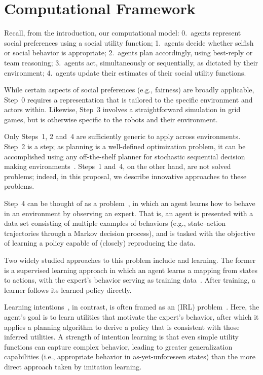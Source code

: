 
\section{Computational Framework}
\label{sec:process}

Recall, from the introduction, our computational model:
0.~agents represent social preferences using a social utility function;
1.~agents decide whether selfish or social behavior is appropriate;
2.~agents plan accordingly, using best-reply or team reasoning;
3.~agents act, simultaneously or sequentially, as dictated by their environment;
4.~agents update their estimates of their social utility functions.

While certain aspects of social preferences (e.g., fairness) are
broadly applicable, Step~0 requires a representation that is tailored
to the specific environment and actors within.  Likewise, Step~3
involves a straightforward simulation in grid games, but is otherwise
specific to the robots and their environment.

Only Steps~1, 2 and~4 are sufficiently generic to apply across
environments.  Step~2 is a  step; as planning is a
well-defined optimization problem, it can be accomplished using any
off-the-shelf planner for stochastic sequential decision making
environments~\cite{Barto95,bellman57,boutilier99,collins95,kearns99b,kocsis06}.
%
Steps~1 and~4, on the other hand, are not solved problems; indeed, in
this proposal, we describe innovative approaches to these problems.

Step~4 can be thought of as a 
problem~\cite{argall09}, in which an agent learns how to behave in an
environment by observing an expert.  That is, an agent is presented
with a data set consisting of multiple examples of behaviors (e.g.,
state--action trajectories through a Markov decision process), and is
tasked with the objective of learning a policy capable of (closely)
reproducing the data.

Two widely studied approaches to this problem include
 and  learning.  The former is a
supervised learning approach in which an agent learns a mapping from
states to actions, with the expert's behavior serving as training
data~\cite{pomerleau93}.  After training, a learner follows its
learned policy directly.

Learning intentions~\cite{macglashan15b}, in contrast, is often framed
as an  (IRL)
problem~\cite{babes11,ng00}.  Here, the agent's goal is to learn
utilities that motivate the expert's behavior, after which it applies a
planning algorithm to derive a policy that is consistent with those
inferred utilities.  A strength of intention learning is that even simple
utility functions can capture complex behavior, leading to greater
generalization capabilities (i.e., appropriate behavior in
as-yet-unforeseen states) than the more direct approach taken by
imitation learning.

